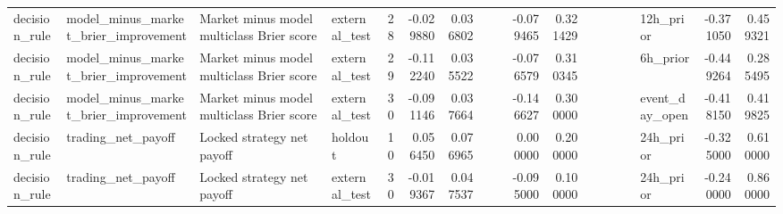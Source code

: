 \begin{tabular}{llllrrrrrrrlrrllrr}
decision\_rule & model\_minus\_market\_brier\_improvement & Market minus model multiclass Brier score & external\_test & 28 & -0.029880 & 0.036802 &  &  & -0.079465 & 0.321429 &  &  &  &  & 12h\_prior & -0.371050 & 0.459321 \\
decision\_rule & model\_minus\_market\_brier\_improvement & Market minus model multiclass Brier score & external\_test & 29 & -0.112240 & 0.035522 &  &  & -0.076579 & 0.310345 &  &  &  &  & 6h\_prior & -0.449264 & 0.285495 \\
decision\_rule & model\_minus\_market\_brier\_improvement & Market minus model multiclass Brier score & external\_test & 30 & -0.091146 & 0.037664 &  &  & -0.146627 & 0.300000 &  &  &  &  & event\_day\_open & -0.418150 & 0.419825 \\
decision\_rule & trading\_net\_payoff & Locked strategy net payoff & holdout & 10 & 0.056450 & 0.076965 &  &  & 0.000000 & 0.200000 &  &  &  &  & 24h\_prior & -0.325000 & 0.610000 \\
decision\_rule & trading\_net\_payoff & Locked strategy net payoff & external\_test & 30 & -0.019367 & 0.047537 &  &  & -0.095000 & 0.100000 &  &  &  &  & 24h\_prior & -0.240000 & 0.860000 \\
\bottomrule
\end{tabular}
